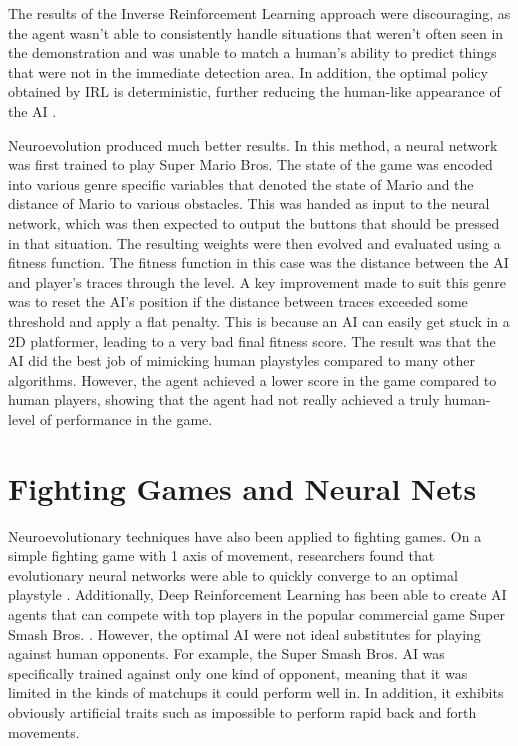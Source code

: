 The results of the Inverse Reinforcement Learning approach were discouraging, as the agent wasn't able to consistently handle situations that weren't often seen in the demonstration and was unable to match a human's ability to predict things that were not in the immediate detection area. In addition, the optimal policy obtained by IRL is deterministic, further reducing the human-like appearance of the AI \parencite{MarioImitation2}.

Neuroevolution produced much better results. In this method, a neural network was first trained to play Super Mario Bros. The state of the game was encoded into various genre specific variables that denoted the state of Mario and the distance of Mario to various obstacles. This was handed as input to the neural network, which was then expected to output the buttons that should be pressed in that situation. The resulting weights were then evolved and evaluated using a fitness function. The fitness function in this case was the distance between the AI and player's traces through the level. A key improvement made to suit this genre was to reset the AI's position if the distance between traces exceeded some threshold and apply a flat penalty. This is because an AI can easily get stuck in a 2D platformer, leading to a very bad final fitness score. The result was that the AI did the best job of mimicking human playstyles compared to many other algorithms. However, the agent achieved a lower score in the game compared to human players, showing that the agent had not really achieved a truly human-level of performance in the game.

\section{Fighting Games and Neural Nets}
Neuroevolutionary techniques have also been applied to fighting games. On a simple fighting game with 1 axis of movement, researchers found that evolutionary neural networks were able to quickly converge to an optimal playstyle \parencite{FightingAIComparison}. Additionally, Deep Reinforcement Learning has been able to create AI agents that can compete with top players in the popular commercial game Super Smash Bros. \parencite{SuperSmashBros}. However, the optimal AI were not ideal substitutes for playing against human opponents. For example, the Super Smash Bros. AI was specifically trained against only one kind of opponent, meaning that it was limited in the kinds of matchups it could perform well in. In addition, it exhibits obviously artificial traits such as impossible to perform rapid back and forth movements.

